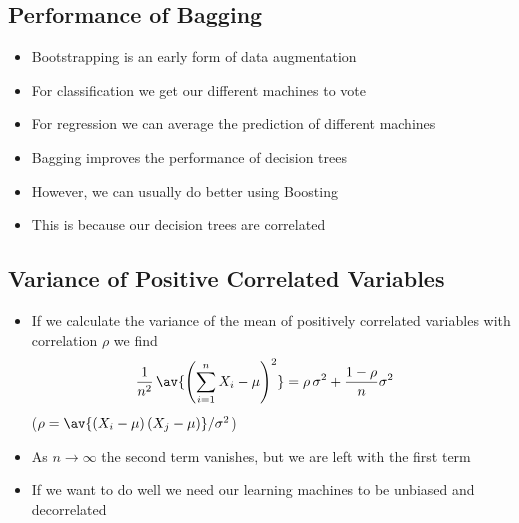 
\begin{slide}
\section{Performance of Bagging}

\begin{PauseHighLight}
  \begin{itemize}
  \item Bootstrapping is an early form of data augmentation\pause
  \item For classification we get our different machines to vote\pause
  \item For regression we can average the prediction of different
    machines\pause
  \item Bagging improves the performance of decision trees\pause
  \item However, we can usually do better using Boosting\pause
  \item This is because our decision trees are correlated\pause
  \end{itemize}
\end{PauseHighLight}

\end{slide}



\begin{slide}
\section{Variance of Positive Correlated Variables}

\begin{PauseHighLight}
  \begin{itemize}
  \item If we calculate the variance of the mean of positively correlated
    variables with correlation $\rho$ we find
    \begin{align*}
      \frac{1}{n^2} \, \av{ \left(\sum_{i=1}^n X_i -\mu\right)^2}
      &= \rho\,\sigma^2 + \frac{1-\rho}{n} \sigma^2
    \end{align*}
  ($\rho = \av{(X_i-\mu)\,(X_j-\mu)}/\sigma^2$)\pause
  \item As $n\rightarrow\infty$ the second term vanishes, but we are left
    with the first term\pause
  \item If we want to do well we need our learning machines to be
    unbiased and decorrelated\pause
  \end{itemize}
\end{PauseHighLight}


\end{slide}


